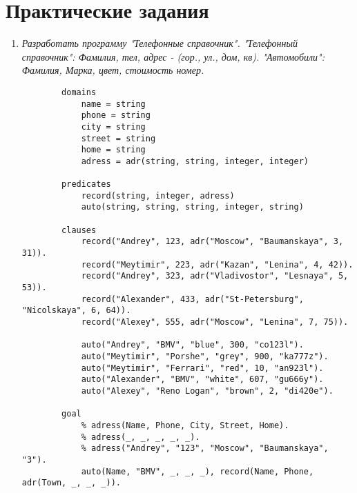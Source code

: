 
\chapter{Практические задания}

\begin{enumerate}[wide=0pt]

	\item \textit{Разработать программу "Телефонные справочник".
	"Телефонный справочник": Фамилия, тел, адрес - (гор., ул., дом, кв).
	"Автомобили": Фамилия, Марка, цвет, стоимость номер.}

		\begin{lstlisting}
		domains
			name = string
			phone = string
			city = string	
			street = string
			home = string
			adress = adr(string, string, integer, integer) 
			
		predicates
			record(string, integer, adress)
			auto(string, string, string, integer, string)
		
		clauses
			record("Andrey", 123, adr("Moscow", "Baumanskaya", 3, 31)).
			record("Meytimir", 223, adr("Kazan", "Lenina", 4, 42)).
			record("Andrey", 323, adr("Vladivostor", "Lesnaya", 5, 53)).
			record("Alexander", 433, adr("St-Petersburg", "Nicolskaya", 6, 64)).
			record("Alexey", 555, adr("Moscow", "Lenina", 7, 75)).
		
			auto("Andrey", "BMV", "blue", 300, "co123l").
			auto("Meytimir", "Porshe", "grey", 900, "ka777z").
			auto("Meytimir", "Ferrari", "red", 10, "an923l").
			auto("Alexander", "BMV", "white", 607, "gu666y").
			auto("Alexey", "Reno Logan", "brown", 2, "di420e").
		
		goal
			% adress(Name, Phone, City, Street, Home).
			% adress(_, _, _, _, _).
			% adress("Andrey", "123", "Moscow", "Baumanskaya", "3").
			auto(Name, "BMV", _, _, _), record(Name, Phone, adr(Town, _, _, _)).
		

		\end{lstlisting}






\end{enumerate}
